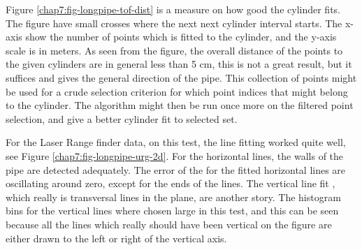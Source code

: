 Figure \ref{chap7:fig-longpipe-tof-dist} is a measure on how good the cylinder fits. The
figure have small crosses where the next next cylinder interval starts. The x-axis show
the number of points which is fitted to the cylinder, and the y-axis scale is in meters.
As seen from the figure, the overall distance of the points to the given cylinders are in
general less than 5 cm, this is not a great result, but it suffices and gives the general
direction of the pipe. This collection of points might be used for a crude selection
criterion for which point indices that might belong to the cylinder. The algorithm might
then be run once more on the filtered point selection, and give a better cylinder fit to
selected set. 

For the Laser Range finder data, on this test, the line fitting worked quite well, see
Figure \ref{chap7:fig-longpipe-urg-2d}. For the horizontal lines, the walls of the pipe
are detected adequately. The error of the for the fitted horizontal lines are oscillating
around zero, except for the ends of the lines. The vertical line fit , which
really is transversal lines in the plane, are another story. The histogram bins for the
vertical lines where chosen large in this test, and this can be seen because all the lines
which really should have been vertical on the figure are either drawn to the left or right
of the vertical axis. 

